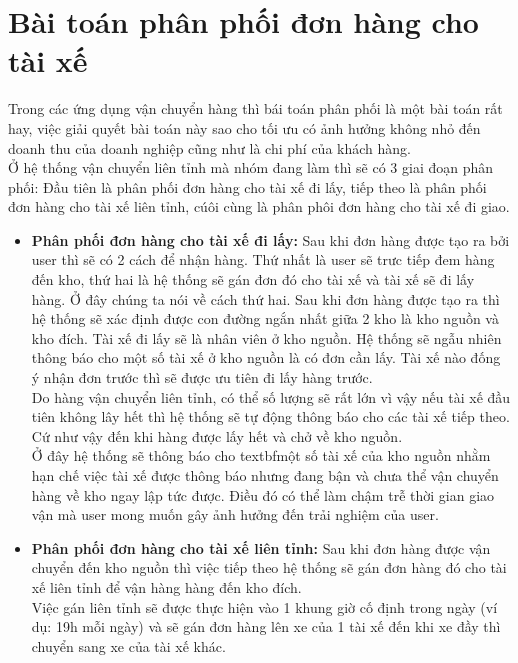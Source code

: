 		\section{Bài toán phân phối đơn hàng cho tài xế }
		    Trong các ứng dụng vận chuyển hàng thì bái toán phân phối là một bài toán rất hay, việc giải quyết bài toán này sao cho tối ưu có ảnh hưởng không nhỏ đến doanh thu của doanh nghiệp cũng như là chi phí của khách hàng.\\
		    Ở hệ thống vận chuyển liên tỉnh mà nhóm đang làm thì sẽ có 3 giai đoạn phân phối: Đầu tiên là phân phối đơn hàng cho tài xế đi lấy, tiếp theo là phân phối đơn hàng cho tài xế liên tỉnh, cúôi cùng là phân phôi đơn hàng cho tài xế đi giao.
		    
		     \begin{itemize}
                \item \textbf{Phân phối đơn hàng cho tài xế đi lấy:} Sau khi đơn hàng được tạo ra bởi user thì sẽ có 2 cách để nhận hàng. Thứ nhất là user sẽ trưc tiếp đem hàng đến kho, thứ hai là hệ thống sẽ gán đơn đó cho tài xế và tài xế sẽ đi lấy hàng. Ở đây chúng ta nói về cách thứ hai. Sau khi đơn hàng được tạo ra thì hệ thống sẽ xác định được con đường ngắn nhất giữa 2 kho là kho nguồn và kho đích. Tài xế đi lấy sẽ là nhân viên ở kho nguồn. Hệ thống sẽ ngẫu nhiên thông báo cho một số tài xế ở kho nguồn là có đơn cần lấy. Tài xế nào đống ý nhận đơn trước thì sẽ được ưu tiên đi lấy hàng trước.\\
                Do hàng vận chuyển liên tỉnh, có thể số lượng sẽ rất lớn vì vậy nếu tài xế đầu tiên không lây hết thì hệ thống sẽ tự động thông báo cho các tài xế tiếp theo. Cứ như vậy đến khi hàng được lấy hết và chở về kho nguồn.\\
                Ở đây hệ thống sẽ thông báo cho textbf{một số tài xế } của kho nguồn nhằm hạn chế việc tài xế được thông báo nhưng đang bận và chưa thể vận chuyển hàng về kho ngay lập tức được. Điều đó có thể làm chậm trễ thời gian giao vận mà user mong muốn gây ảnh hưởng đến trải nghiệm của user.
            
                \item \textbf{Phân phối đơn hàng cho tài xế  liên tỉnh:} Sau khi đơn hàng được vận chuyển đến kho nguồn thì việc tiếp theo hệ thống sẽ gán đơn hàng đó cho tài xế liên tỉnh để vận hàng hàng đến kho đích.\\
                
                Việc gán liên tỉnh sẽ được thực hiện vào 1 khung giờ cố định trong ngày (ví dụ: 19h mỗi ngày) và sẽ gán đơn hàng lên xe của 1 tài xế đến khi xe đầy thì chuyển sang xe của tài xế khác.\\
                

\end{itemize}
